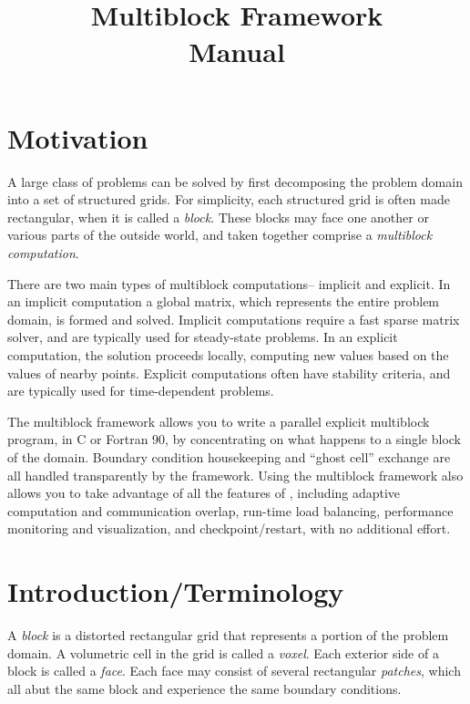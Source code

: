 \documentclass[10pt]{article}
\title{\charmpp\\ Multiblock Framework\\ Manual}
\begin{document}
\maketitle

\section{Motivation}
A large class of problems can be solved by first decomposing the
problem domain into a set of structured grids.  For simplicity,
each structured grid is often made rectangular, when it is called a {\em block}.
These blocks may face one another or various parts of the outside world,
and taken together comprise a {\em multiblock computation}.

There are two main types of multiblock computations-- implicit and explicit.
In an implicit computation a global matrix, which represents the entire
problem domain, is formed and solved.  Implicit computations require
a fast sparse matrix solver, and are typically used for steady-state
problems.  In an explicit computation, the solution proceeds locally,
computing new values based on the values of nearby points. Explicit
computations often have stability criteria, and are typically used for
time-dependent problems.

The \charmpp{} multiblock framework allows you to write a parallel 
explicit multiblock program,
in C or Fortran 90, by concentrating on what happens to a single block
of the domain.  Boundary condition housekeeping and ``ghost cell'' exchange
are all handled transparently by the framework.
Using the multiblock framework also allows you to take advantage of all the
features of \charmpp, including adaptive computation and communication 
overlap, run-time load balancing,  performance
monitoring and visualization, and checkpoint/restart, with no additional
effort.


\section{Introduction/Terminology}
A {\em block} is a distorted rectangular grid that represents a 
portion of the problem domain.  A volumetric cell in the grid
is called a {\em voxel}.  Each exterior side of a block
is called a {\em face}. Each face may consist of several 
rectangular {\em patches}, which all abut the same block 
and experience the same boundary conditions.
\end{document}
